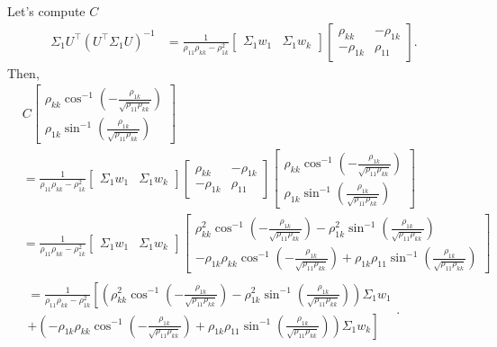 \documentclass{article}
\begin{document}
Let's compute $C$
\begin{align}
  \Sigma_1 U^\top ( U^\top \Sigma_1 U )^{-1}
  &= \frac{ 1 }{ \rho_{11} \rho_{kk} - \rho_{1k}^2 } 
  \begin{bmatrix} \Sigma_1  w_1 & \Sigma_1 w_k \end{bmatrix}
  \begin{bmatrix} \rho_{kk} & -\rho_{1k} \\ -\rho_{1k} & \rho_{11} \end{bmatrix}.
\end{align}
Then,
\begin{align}
  &C \begin{bmatrix}
    \rho_{kk} \cos^{-1}\left(-\frac{\rho_{1k}}{\sqrt{\rho_{11}\rho_{kk}}}\right) \\
    \rho_{1k} \sin^{-1}\left(\frac{\rho_{1k}}{\sqrt{\rho_{11}\rho_{kk}}}\right)
  \end{bmatrix} \\
  &= \frac{ 1 }{ \rho_{11} \rho_{kk} - \rho_{1k}^2 } 
  \begin{bmatrix} \Sigma_1  w_1 & \Sigma_1 w_k \end{bmatrix}
  \begin{bmatrix} \rho_{kk} & -\rho_{1k} \\ -\rho_{1k} & \rho_{11} \end{bmatrix}
  \begin{bmatrix}
    \rho_{kk} \cos^{-1}\left(-\frac{\rho_{1k}}{\sqrt{\rho_{11}\rho_{kk}}}\right) \\
    \rho_{1k} \sin^{-1}\left(\frac{\rho_{1k}}{\sqrt{\rho_{11}\rho_{kk}}}\right)
  \end{bmatrix} \\
  &= \frac{ 1 }{ \rho_{11} \rho_{kk} - \rho_{1k}^2 } 
  \begin{bmatrix} \Sigma_1  w_1 & \Sigma_1 w_k \end{bmatrix}
  \begin{bmatrix}
    \rho_{kk}^2 \cos^{-1}\left(-\frac{\rho_{1k}}{\sqrt{\rho_{11}\rho_{kk}}}\right) - \rho_{1k}^2 \sin^{-1}\left(\frac{\rho_{1k}}{\sqrt{\rho_{11}\rho_{kk}}}\right) \\
    -\rho_{1k} \rho_{kk} \cos^{-1}\left(-\frac{\rho_{1k}}{\sqrt{\rho_{11}\rho_{kk}}}\right) + \rho_{1k} \rho_{11} \sin^{-1}\left(\frac{\rho_{1k}}{\sqrt{\rho_{11}\rho_{kk}}}\right)
  \end{bmatrix} \\
  &\begin{multlined} = \frac{ 1 }{ \rho_{11} \rho_{kk} - \rho_{1k}^2 } 
  \left[ \left( \rho_{kk}^2 \cos^{-1}\left(-\frac{\rho_{1k}}{\sqrt{\rho_{11}\rho_{kk}}}\right) - \rho_{1k}^2 \sin^{-1}\left(\frac{\rho_{1k}}{\sqrt{\rho_{11}\rho_{kk}}}\right) \right) \Sigma_1 w_1 \right. \\
  \left. + \left( -\rho_{1k} \rho_{kk} \cos^{-1}\left(-\frac{\rho_{1k}}{\sqrt{\rho_{11}\rho_{kk}}}\right) + \rho_{1k} \rho_{11} \sin^{-1}\left(\frac{\rho_{1k}}{\sqrt{\rho_{11}\rho_{kk}}}\right) \right) \Sigma_1 w_k \right]
  \end{multlined}.
\end{align}
\end{document}
